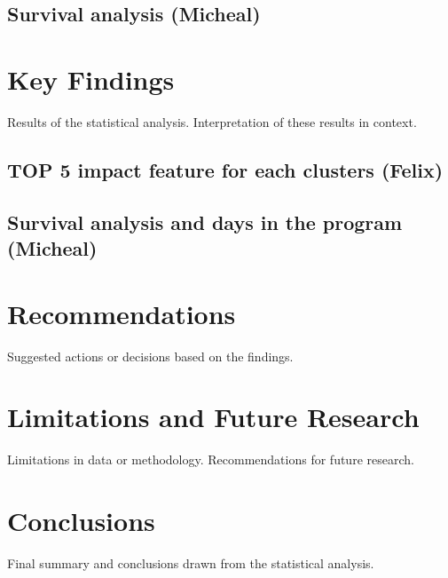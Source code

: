 \documentclass[12pt]{article}
\begin{document}
\subsection{Survival analysis (Micheal)}

\section{Key Findings}

Results of the statistical analysis.
Interpretation of these results in context.

\subsection{TOP 5 impact feature for each clusters (Felix)}

\subsection{Survival analysis and days in the program (Micheal)}

\section{Recommendations}

Suggested actions or decisions based on the findings.

\section{Limitations and Future Research}

Limitations in data or methodology.
Recommendations for future research.

\section{Conclusions}

Final summary and conclusions drawn from the statistical analysis.


\newpage
%
%

 
\end{document}
